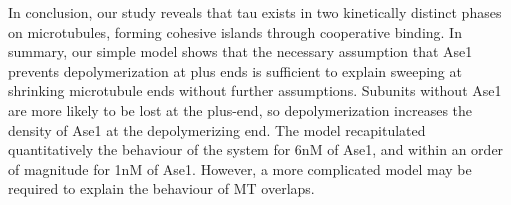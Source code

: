 In conclusion, our study reveals that tau exists in two kinetically distinct phases on microtubules, forming cohesive islands through cooperative binding.
In summary, our simple model shows that the necessary assumption that Ase1 prevents depolymerization at plus ends is sufficient to explain sweeping at shrinking microtubule ends without further assumptions. Subunits without Ase1 are more likely to be lost at the plus-end, so depolymerization increases the density of Ase1 at the depolymerizing end. The model recapitulated quantitatively the behaviour of the system for 6nM of Ase1, and within an order of magnitude for 1nM of Ase1. However, a more complicated model may be required to explain the behaviour of MT overlaps.